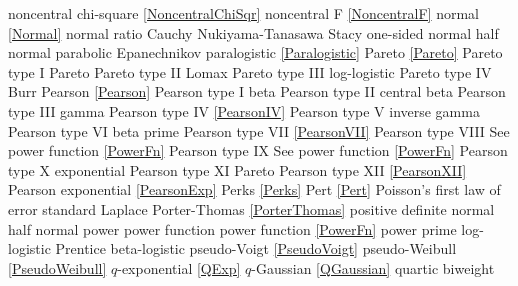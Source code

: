 noncentral chi-square			\dotfill	\eqref{NoncentralChiSqr}			\ncite
noncentral F					\dotfill	\eqref{NoncentralF}					\ncite	%
normal 							\dotfill	\eqref{Normal}						\ncite	%
normal ratio  					\dotfill	Cauchy 								\ncite	%
Nukiyama-Tanasawa 				\dotfill	Stacy 								   	%
%
one-sided normal  				\dotfill	half normal							\ncite	%
parabolic						\dotfill	Epanechnikov						\ncite
paralogistic					\dotfill	\eqref{Paralogistic} 				\ncite	%
Pareto							\dotfill	\eqref{Pareto}						\ncite	%
Pareto type I					\dotfill	Pareto								\ncite	%
Pareto type II					\dotfill	Lomax 								\ncite	%
Pareto type III					\dotfill	log-logistic						\ncite	%
Pareto type IV					\dotfill	Burr								\ncite	%
Pearson			 				\dotfill	\eqref{Pearson}						\ncite	%
Pearson type I					\dotfill	beta 								\ncite	%
Pearson type II					\dotfill	central beta						\ncite	%
Pearson type III   				\dotfill	gamma 								\ncite	%
Pearson type IV   				\dotfill	\eqref{PearsonIV} 					\ncite	%
Pearson type V    				\dotfill	inverse gamma						\ncite	%
Pearson type VI					\dotfill	beta prime 							\ncite	%
Pearson type VII				\dotfill	\eqref{PearsonVII} 					\ncite	%
Pearson type VIII				\dotfill	See power function \eqref{PowerFn}	\ncite	%
Pearson type IX					\dotfill	See power function \eqref{PowerFn}	\ncite	%
Pearson type X    				\dotfill	exponential							\ncite	%
Pearson type XI    				\dotfill	Pareto								
Pearson type XII 				\dotfill	\eqref{PearsonXII}					\ncite	%
Pearson exponential				\dotfill	\eqref{PearsonExp}					\mcite{\self}
Perks							\dotfill	\eqref{Perks} 						\ncite	%
Pert							\dotfill	\eqref{Pert} 						\ncite	%
Poisson's first law of error	\dotfill	standard Laplace					\ncite	%
Porter-Thomas					\dotfill	\eqref{PorterThomas}				\ncite
positive definite normal 		\dotfill	half normal 						\ncite 	%
power							\dotfill	power function 						\ncite	%
power function					\dotfill	\eqref{PowerFn}						\ncite	%
power prime						\dotfill	log-logistic						\mcite{\self}
Prentice 						\dotfill	beta-logistic							
pseudo-Voigt					\dotfill	\eqref{PseudoVoigt}					\ncite
pseudo-Weibull					\dotfill	\eqref{PseudoWeibull}				\ncite	%
%
$q$-exponential					\dotfill	\eqref{QExp}						\ncite	%
$q$-Gaussian					\dotfill	\eqref{QGaussian}					\ncite	%
quartic							\dotfill	biweight							\ncite
